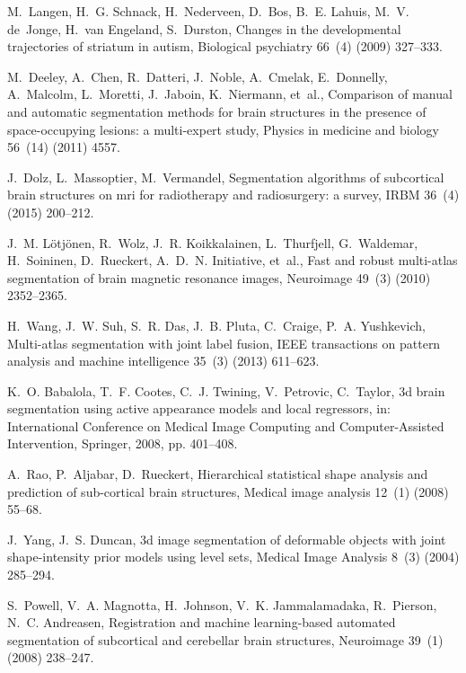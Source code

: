 \documentclass[twoside,fleqn,espcrc2]{elsarticle}
\begin{document}
\begin{thebibliography}{10}
M.~Langen, H.~G. Schnack, H.~Nederveen, D.~Bos, B.~E. Lahuis, M.~V. de~Jonge,
  H.~van Engeland, S.~Durston, Changes in the developmental trajectories of
  striatum in autism, Biological psychiatry 66~(4) (2009) 327--333.

M.~Deeley, A.~Chen, R.~Datteri, J.~Noble, A.~Cmelak, E.~Donnelly, A.~Malcolm,
  L.~Moretti, J.~Jaboin, K.~Niermann, et~al., Comparison of manual and
  automatic segmentation methods for brain structures in the presence of
  space-occupying lesions: a multi-expert study, Physics in medicine and
  biology 56~(14) (2011) 4557.

J.~Dolz, L.~Massoptier, M.~Vermandel, Segmentation algorithms of subcortical
  brain structures on mri for radiotherapy and radiosurgery: a survey, IRBM
  36~(4) (2015) 200--212.

J.~M. L{\"o}tj{\"o}nen, R.~Wolz, J.~R. Koikkalainen, L.~Thurfjell, G.~Waldemar,
  H.~Soininen, D.~Rueckert, A.~D.~N. Initiative, et~al., Fast and robust
  multi-atlas segmentation of brain magnetic resonance images, Neuroimage
  49~(3) (2010) 2352--2365.

H.~Wang, J.~W. Suh, S.~R. Das, J.~B. Pluta, C.~Craige, P.~A. Yushkevich,
  Multi-atlas segmentation with joint label fusion, IEEE transactions on
  pattern analysis and machine intelligence 35~(3) (2013) 611--623.

K.~O. Babalola, T.~F. Cootes, C.~J. Twining, V.~Petrovic, C.~Taylor, 3d brain
  segmentation using active appearance models and local regressors, in:
  International Conference on Medical Image Computing and Computer-Assisted
  Intervention, Springer, 2008, pp. 401--408.

A.~Rao, P.~Aljabar, D.~Rueckert, Hierarchical statistical shape analysis and
  prediction of sub-cortical brain structures, Medical image analysis 12~(1)
  (2008) 55--68.

J.~Yang, J.~S. Duncan, 3d image segmentation of deformable objects with joint
  shape-intensity prior models using level sets, Medical Image Analysis 8~(3)
  (2004) 285--294.

S.~Powell, V.~A. Magnotta, H.~Johnson, V.~K. Jammalamadaka, R.~Pierson, N.~C.
  Andreasen, Registration and machine learning-based automated segmentation of
  subcortical and cerebellar brain structures, Neuroimage 39~(1) (2008)
  238--247.


\end{thebibliography}
\end{document}
